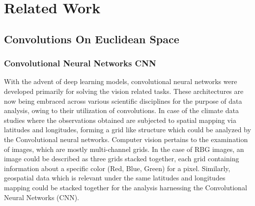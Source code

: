 
\clearpage
\cleardoublepage

\chapter{Related Work}
\section{Convolutions On Euclidean Space}
\subsection{Convolutional Neural Networks CNN}
With the advent of deep learning models, convolutional neural networks were developed primarily for solving the vision related tasks. These architectures are now being embraced across various scientific disciplines for the purpose of data analysis, owing to their utilization of convolutions.
In case of the climate data studies where the observations obtained are subjected to spatial mapping via latitudes and longitudes, forming a grid like structure which could be analyzed by the Convolutional neural networks.
Computer vision pertains to the examination of images, which are mostly multi-channel grids. In the case of RBG images, an image could be described as three grids stacked together, each grid containing information about a specific color (Red, Blue, Green) for a pixel. Similarly, geospatial data which is relevant under the same latitudes and longitudes mapping could be stacked together for the analysis harnessing the Convolutional Neural Networks (CNN).

